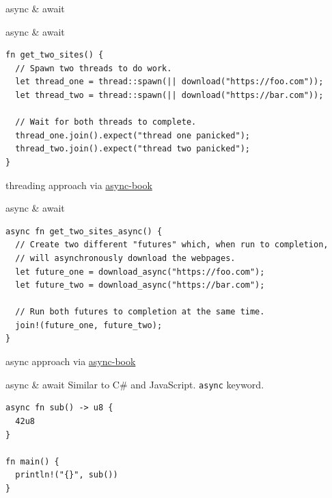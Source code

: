 \documentclass{beamer}
\begin{document}
\begin{frame}[standout]
  async \& await
\end{frame}

\begin{frame}[fragile]{async \& await}
  \begin{verbatim}
fn get_two_sites() {
  // Spawn two threads to do work.
  let thread_one = thread::spawn(|| download("https://foo.com"));
  let thread_two = thread::spawn(|| download("https://bar.com"));

  // Wait for both threads to complete.
  thread_one.join().expect("thread one panicked");
  thread_two.join().expect("thread two panicked");
}
  \end{verbatim}
  threading approach via \href{https://rust-lang.github.io/async-book/01_getting_started/02_why_async.html}{async-book}
\end{frame}

\begin{frame}[fragile]{async \& await}
  \begin{verbatim}
async fn get_two_sites_async() {
  // Create two different "futures" which, when run to completion,
  // will asynchronously download the webpages.
  let future_one = download_async("https://foo.com");
  let future_two = download_async("https://bar.com");

  // Run both futures to completion at the same time.
  join!(future_one, future_two);
}
  \end{verbatim}
  async approach via \href{https://rust-lang.github.io/async-book/01_getting_started/02_why_async.html}{async-book}
\end{frame}

\begin{frame}[fragile]{async \& await}
  Similar to C\# and JavaScript.
  \texttt{async} keyword. 

  \begin{verbatim}
async fn sub() -> u8 {
  42u8
}

fn main() {
  println!("{}", sub())
}
  \end{verbatim}
\end{frame}
\end{document}

